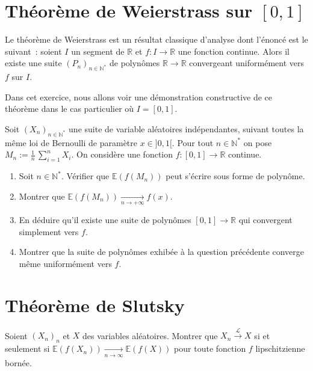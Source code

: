 \section{Théorème de Weierstrass sur
\([0,1]\)}\label{IV-thuxe9oruxe8me-de-weierstrass-sur-01}

Le théorème de Weierstrass est un résultat classique d'analyse dont
l'énoncé est le suivant~: soient \(I\) un segment de \(\mathbb{R}\) et
\(f : I \to \mathbb{R}\) une fonction continue. Alors il existe une
suite \((P_n)_{n\in\mathbb{N}^\ast}\) de polynômes
\(\mathbb{R}\to\mathbb{R}\) convergeant uniformément vers \(f\) sur
\(I\).

Dans cet exercice, nous allons voir une démonstration constructive de ce
théorème dans le cas particulier où \(I = [0,1]\).

\label{IV-weier-thm}
Soit \(\left(X_n\right)_{n\in\mathbb{N}^\ast}\) une suite de variable
aléatoires indépendantes, suivant toutes la même loi de Bernoulli de
paramètre \(x \in ]0,1[\). Pour tout \(n\in\mathbb{N}^\ast\) on pose
\(M_n := \frac{1}{n}\,\sum_{i = 1}^n X_i\). On considère une fonction
\(f : [0,1] \to \mathbb{R}\) continue.

\begin{enumerate}
\def\labelenumi{\arabic{enumi}.}
\item
  Soit \(n\in\mathbb{N}^\ast\). Vérifier que
  \(\mathbb{E}\left( f(M_n) \right)\) peut s'écrire sous forme de
  polynôme.
\item
  Montrer que
  \(\mathbb{E}\left( f(M_n) \right) \xrightarrow[n\to+\infty]{} f(x).\)
\item
  En déduire qu'il existe une suite de polynômes
  \([0,1] \to \mathbb{R}\) qui convergent simplement vers \(f\).
\item
  Montrer que la suite de polynômes exhibée à la question précédente
  converge même uniformément vers \(f\).
\end{enumerate}


\section{Théorème de Slutsky}\label{IV-thuxe9oruxe8me-de-slutsky}

\label{IV-slut1}
Soient \((X_n)_n\) et \(X\) des variables aléatoires. Montrer que
\(X_n \xrightarrow{\mathcal{L}} X\) si et seulement si
\(\mathbb{E}(f(X_n)) \xrightarrow[n\to\infty]{} \mathbb{E}(f(X))\) pour
toute fonction \(f\) lipschitzienne bornée.

